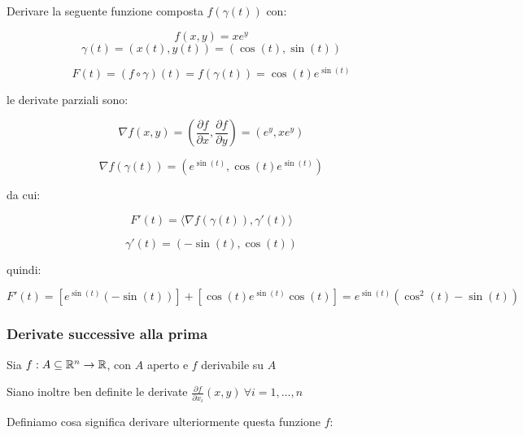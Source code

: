 Derivare la seguente funzione composta \( f(\gamma(t))\) con:

\[
    f(x,y)= xe^{y}
\]
\[
    \gamma(t) = (x(t), y(t)) = (\cos (t) , \sin (t))
\]

\[
    F(t) = (f \circ \gamma) (t) = f(\gamma(t)) = \cos (t) e ^{\sin (t)}
\]

le derivate parziali sono:

\[
    \nabla f(x,y) = \left( \frac{\partial f}{\partial x}, \frac{\partial f}{\partial y} \right) = (e^{y}, xe^{y})
\]

\[
    \nabla f(\gamma(t)) = (e ^{\sin (t)}, \cos (t) e ^{\sin (t)})
\]

da cui:

\[
    F'(t) = \langle \nabla f(\gamma(t)), \gamma'(t) \rangle
\]

\[
    \gamma'(t) = (-\sin (t), \cos (t))
\]

quindi:

\[
    F'(t) = \left[ e ^{\sin(t)} (- \sin (t)) \right] + \left[ \cos (t) e ^{\sin (t)}\cos (t) \right] = e^{\sin(t)} \left( \cos^{2}(t) -\sin(t) \right)
\]

\pagebreak
\subsubsection{Derivate successive alla prima}

Sia \(f: A \subseteq \mathbb{R}^{n} \rightarrow \mathbb{R} \), con \(A\) aperto e \(f\) derivabile su \(A\)

Siano inoltre ben definite le derivate \(\frac{\partial f}{\partial x_i}(x,y) ~\forall i=1,\ldots,n\)

Definiamo cosa significa derivare ulteriormente questa funzione \(f\):



